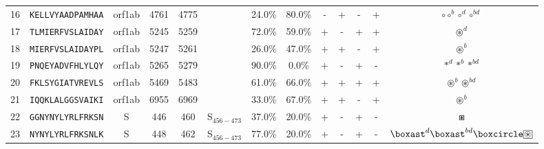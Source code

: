 \begin{tabular}{rcccccccccccc}
16 &  \texttt{KELLVYAADPAMHAA} &  orf1ab &   4761 &  4775 &                &                          24.0\% &                           80.0\% &          - &           + &          - &           + &                                                   $ \circ \circ^b \circ^d \circ^{bd} $ \\
17 &  \texttt{TLMIERFVSLAIDAY} &  orf1ab &   5245 &  5259 &                &                          72.0\% &                           59.0\% &          + &           - &          + &           + &                                                                      $ \circledast^d $ \\
18 &  \texttt{MIERFVSLAIDAYPL} &  orf1ab &   5247 &  5261 &                &                          26.0\% &                           47.0\% &          + &           + &          - &           + &                                                                      $ \circledast^b $ \\
19 &  \texttt{PNQEYADVFHLYLQY} &  orf1ab &   5265 &  5279 &                &                          90.0\% &                            0.0\% &          + &           - &          + &           - &                                                            $ \ast^d \ast^b \ast^{bd} $ \\
20 &  \texttt{FKLSYGIATVREVLS} &  orf1ab &   5469 &  5483 &                &                          61.0\% &                           66.0\% &          + &           + &          + &           + &                                                     $ \circledast^b \circledast^{bd} $ \\
21 &  \texttt{IQQKLALGGSVAIKI} &  orf1ab &   6955 &  6969 &                &                          33.0\% &                           67.0\% &          + &           + &          - &           + &                                                                      $ \circledast^b $ \\
22 &  \texttt{GGNYNYLYRLFRKSN} &       S &    446 &   460 &  S$_{456-473}$ &                          37.0\% &                           20.0\% &          + &           - &          + &           - &                                                                            $ \boxast $ \\
23 &  \texttt{NYNYLYRLFRKSNLK} &       S &    448 &   462 &  S$_{456-473}$ &                          77.0\% &                           20.0\% &          + &           - &          + &           - &  $ \boxast^d \boxast^{bd} \boxcircle \setlength{\fboxsep}{0.5pt} \boxed{\circledast} $ \\

\end{tabular}
